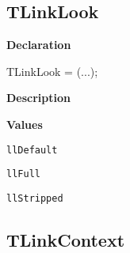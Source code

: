 \documentclass{report}
\newif\ifpdf
\begin{document}
\subsection*{TLinkLook}
\fi
\label{PasDoc_Gen-TLinkLook}
\begin{list}{}{
\setlength{\itemindent}{0cm}
\setlength{\listparindent}{0cm}
\setlength{\leftmargin}{\evensidemargin}
\addtolength{\leftmargin}{\tmplength}
\settowidth{\labelsep}{X}
\addtolength{\leftmargin}{\labelsep}
\setlength{\labelwidth}{\tmplength}
}
\item[\textbf{Declaration}\hfill]
\ifpdf
\begin{flushleft}
\fi
\begin{ttfamily}
TLinkLook = (...);\end{ttfamily}

\ifpdf
\end{flushleft}
\fi

\par
\item[\textbf{Description}]
 \item[\textbf{Values}]
\begin{description}
\item[\texttt{llDefault}] \label{PasDoc_Gen-llDefault}
\index{}
 
\item[\texttt{llFull}] \label{PasDoc_Gen-llFull}
\index{}
 
\item[\texttt{llStripped}] \label{PasDoc_Gen-llStripped}
\index{}
 
\end{description}


\end{list}
\ifpdf
\subsection*{\large{\textbf{TLinkContext}}\normalsize\hspace{1ex}\hrulefill}
\else
\end{document}
